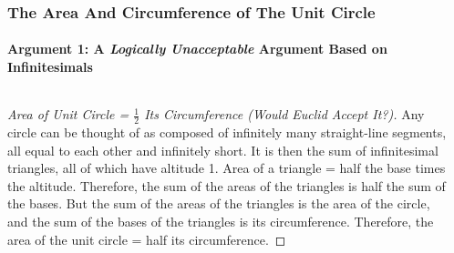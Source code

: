 \begin{frame}
\frametitle{The Area And Circumference of The Unit Circle}
\framesubtitle{Argument 1: A \textit{Logically Unacceptable} Argument Based on Infinitesimals}
\label{slide:rejected-by-euclid}
\begin{columns}[c]
\begin{column}{.7\textwidth}
\begin{proof}[Area of Unit Circle = $\frac{1}{2}$ Its Circumference ({\tiny Would Euclid Accept It?})]
Any circle can be thought of as composed of \alert{infinitely many straight-line segments, all equal to each other and infinitely short}.  It is then the sum of \alert{infinitesimal triangles}, all of which have altitude 1. Area of a triangle = half the base times the altitude. Therefore, the sum of the areas of the triangles is half the sum of the bases. But the sum of the areas of the triangles is the area of the circle, and the sum of the bases of the triangles is its circumference. \alert{Therefore, the area of the unit circle = half its circumference}.
\end{proof}
\end{column}
\begin{column}{0.3\textwidth}
\end{column}
\end{columns}
\end{frame}
